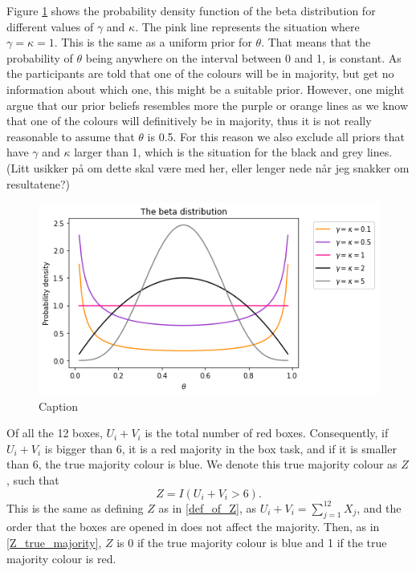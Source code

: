 Figure \ref{fig:pdf_beta_distr} shows the probability density function of the beta distribution for different values of $\gamma$ and $\kappa$. The pink line represents the situation where $\gamma=\kappa=1$. This is the same as a uniform prior for $\theta$. That means that the probability of $\theta$ being anywhere on the interval between 0 and 1, is constant. As the participants are told that one of the colours will be in majority, but get no information about which one, this might be a suitable prior.
However, one might argue that our prior beliefs resembles more the purple or orange lines as we know that one of the colours will definitively be in majority, thus it is not really reasonable to assume that $\theta$ is 0.5. For this reason we also exclude all priors that have $\gamma$ and $\kappa$ larger than 1, which is the situation for the black and grey lines. (Litt usikker på om dette skal være med her, eller lenger nede når jeg snakker om resultatene?)

\begin{figure}
    \centering
    \includegraphics[scale=0.5]{pictures/beta_pdf.png}
    \caption{Caption}
    \label{fig:pdf_beta_distr}
\end{figure}


Of all the 12 boxes, $U_i+V_i$ is the total number of red boxes.
Consequently, if $U_i+V_i$ is bigger than 6, it is a red majority in the box task, and if it is smaller than 6, the true majority colour is blue. We denote this true majority colour as $Z$, such that
\begin{equation}
\label{def_of_Z_2}
    Z = I(U_i+V_i>6).
\end{equation}
This is the same as defining $Z$ as in \eqref{def_of_Z}, as $U_i+V_i = \sum_{j=1}^{12}X_j$, and the order that the boxes are opened in does not affect the majority. Then, as in \eqref{Z_true_majority}, $Z$ is 0 if the true majority colour is blue and 1 if the true majority colour is red. 


